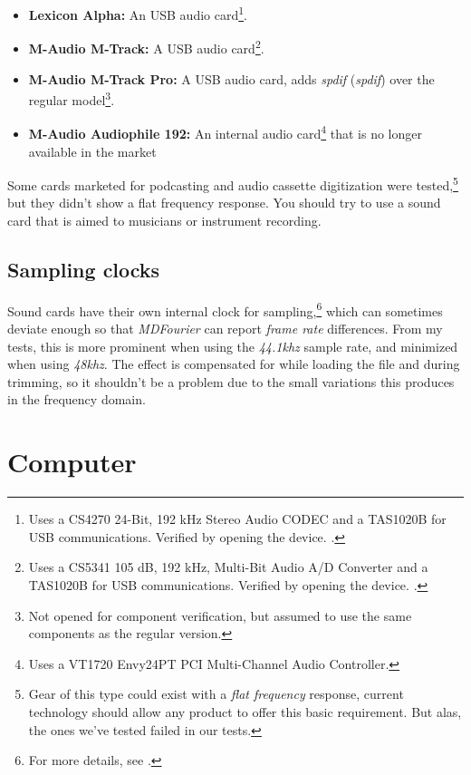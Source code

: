 \documentclass[10pt,a4paper]{report}
\newcommand{\define}[1]{\textit{\acrlong{#1}} (\textit{\acrshort{#1}})}
\newcommand{\khz}[1]{\textit{\mbox{#1\acrshort{khz}}}}
\begin{document}
\begin{appendices}
\begin{itemize}
	\item \textbf{Lexicon Alpha:} An USB audio card\footnote{Uses a CS4270 24-Bit, 192 kHz Stereo Audio CODEC and a TAS1020B for USB communications. Verified by opening the device. \cite{lexicon}.}. 
	\item \textbf{M-Audio M-Track:} A USB audio card\footnote{Uses a CS5341  105 dB, 192 kHz, Multi-Bit Audio A/D Converter and a TAS1020B for USB communications. Verified by opening the device. \cite{maudiomtrack}.}. 
	\item \textbf{M-Audio M-Track Pro:} A USB audio card, adds \define{spdif} over the regular model\footnote{Not opened for component verification, but assumed to use the same components as the regular version.}. \cite{maudiomtrack}
	\item \textbf{M-Audio Audiophile 192:} An internal audio card\footnote{Uses a VT1720 Envy24PT PCI Multi-Channel Audio Controller.} that is no longer available in the market \cite{maudio}
\end{itemize}

Some cards marketed for podcasting and audio cassette digitization were tested,\footnote{Gear of this type could exist with a \textit{flat frequency} response, current technology should allow any product to offer this basic requirement. But alas, the ones we've tested failed in our tests.} but they didn't show a flat frequency response. You should try to use a sound card that is aimed to musicians or instrument recording.

\subsection{Sampling clocks}
\label{samplingclocks}

Sound cards have their own internal clock for sampling,\footnote{For more details, see \cite{SoundCardClock} \cite{soundcardtiming} \cite{gwsoundcardtiming}.} which can sometimes deviate enough so that \textit{MDFourier} can report \textit{frame rate} differences. From my tests, this is more prominent when using the \khz{44.1} sample rate, and minimized when using \khz{48}. The effect is compensated for while loading the file and during trimming, so it shouldn't be a problem  due to the small variations this produces in the frequency domain. 

\section{Computer}


\end{appendices}
\end{document}
